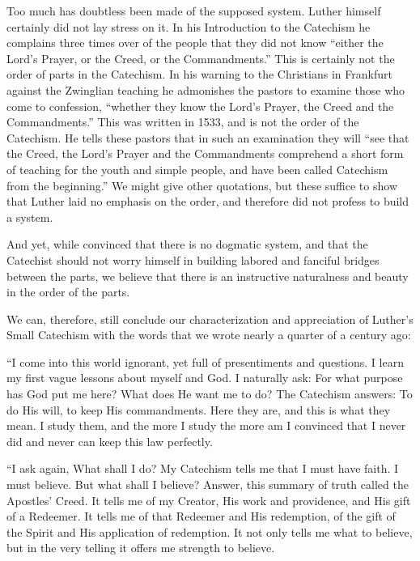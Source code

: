  Too much has doubtless been made of the supposed system. Luther himself certainly did not lay stress on it. In his Introduction to the Catechism he complains three times over of the people that they did not know “either the Lord’s Prayer, or the Creed, or the Commandments.” This is certainly not the order of parts in the Catechism. In his warning to the Christians in Frankfurt against the Zwinglian teaching he admonishes the pastors to examine those who come to confession, “whether they know the Lord’s Prayer, the Creed and the Commandments.” This was written in 1533, and is not the order of the Catechism. He tells these pastors that in such an examination they will “see that the Creed, the Lord’s Prayer and the Commandments comprehend a short form of teaching for the youth and simple people, and have been called Catechism from the beginning.” We might give other quotations, but these suffice to show that Luther laid no emphasis on the order, and therefore did not profess to build a system.

And yet, while convinced that there is no dogmatic system, and that the Catechist should not worry himself in building labored and fanciful
 bridges between the parts, we believe that there is an instructive naturalness and beauty in the order of the parts.

We can, therefore, still conclude our characterization and appreciation of Luther’s Small Catechism with the words that we wrote nearly a quarter of a century ago:

“I come into this world ignorant, yet full of presentiments and questions. I learn my first vague lessons about myself and God. I naturally ask: For what purpose has God put me here? What does He want me to do? The Catechism answers: To do His will, to keep His commandments. Here they are, and this is what they mean. I study them, and the more I study the more am I convinced that I never did and never can keep this law perfectly.

“I ask again, What shall I do? My Catechism tells me that I must have faith. I must believe. But what shall I believe? Answer, this summary of truth called the Apostles’ Creed. It tells me of my Creator, His work and providence, and His gift of a Redeemer. It tells me of that Redeemer and His redemption, of the gift of the Spirit and His application of redemption. It not only tells me what to believe, but in the very telling it offers me strength to believe.

